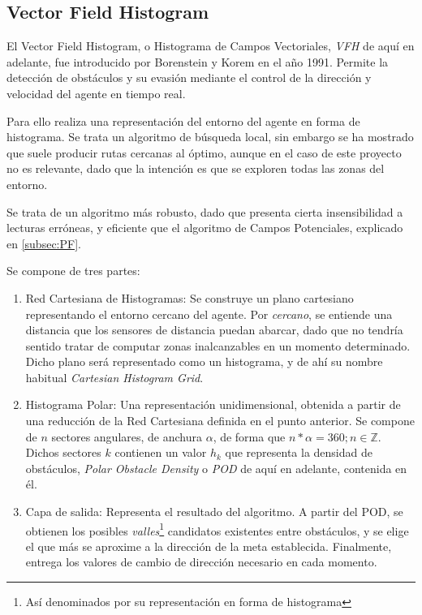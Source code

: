 \newpage
\subsection{Vector Field Histogram}
\label{subsec:VFH}
El Vector Field Histogram, o Histograma de Campos Vectoriales, \textit{VFH} de aquí en adelante, fue introducido por Borenstein y Korem en el año 1991. Permite la detección de obstáculos y su evasión mediante el control de la dirección y velocidad del agente en tiempo 
real.

Para ello realiza una representación del entorno del agente en forma de histograma. Se trata un algoritmo de búsqueda local, sin embargo se ha mostrado que suele producir rutas cercanas al óptimo, aunque en el caso de este proyecto no es relevante, dado que la intención es que se exploren todas las zonas del entorno.

Se trata de un algoritmo más robusto, dado que presenta cierta insensibilidad a lecturas erróneas, y eficiente que el algoritmo de Campos Potenciales, explicado en \ref{subsec:PF}. 

Se compone de tres partes: 
\begin{enumerate}
\item Red Cartesiana de Histogramas: Se construye un plano cartesiano representando el entorno cercano del agente. Por \textit{cercano}, se entiende una distancia que los sensores de distancia puedan abarcar, dado que no tendría sentido tratar de computar zonas inalcanzables en un momento determinado. Dicho plano será representado como un histograma, y de ahí su nombre habitual \textit{Cartesian Histogram Grid}.
\item Histograma Polar: Una representación unidimensional, obtenida a partir de una reducción de la Red Cartesiana definida en el punto anterior. Se compone de $n$ sectores angulares, de anchura $\alpha$, de forma que $n * \alpha = 360; n \in \mathbb{Z}$. Dichos sectores $k$ contienen un valor $h_k$ que representa la densidad de obstáculos, \textit{Polar Obstacle Density} o \textit{POD} de aquí en adelante, contenida en él.
\item Capa de salida: Representa el resultado del algoritmo. A partir del POD, se obtienen los posibles \textit{valles}\footnote{Así denominados por su representación en forma de histograma} candidatos existentes entre obstáculos, y se elige el que más se aproxime a la dirección de la meta establecida. Finalmente, entrega los valores de cambio de dirección necesario en cada momento.
\end{enumerate}

